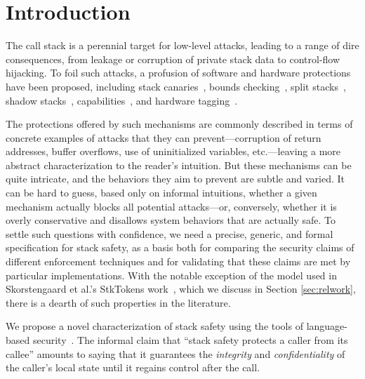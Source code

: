 \documentclass[10pt,conference]{ieeetran}%
\theoremstyle{definition}
\begin{document}
\newcommand{\paragraphx}[1]{\emph{#1.}}

\section{Introduction}

The call stack is a perennial target for low-level attacks, leading to a
range of dire consequences, from leakage or corruption of private stack data
to control-flow hijacking. To foil such attacks, a profusion of
software and hardware protections have been proposed,
%
including stack canaries~\cite{Cowan+98},
bounds checking~\cite{NagarakatteZMZ09,NagarakatteZMZ10,DeviettiBMZ08},
split stacks~\cite{Kuznetsov+14},
shadow stacks~\cite{Dang+15,Shanbhogue+19},
capabilities~\cite{Woodruff+14,Chisnall+15,SkorstengaardLocal,SkorstengaardSTKJFP,Georges+21},
and hardware tagging~\cite{DBLP:conf/sp/RoesslerD18}.
  \ifaftersubmission{}
\fi

The protections offered by such mechanisms are commonly described in terms
of concrete examples of attacks that they can prevent---corruption of return
addresses, buffer overflows, use of uninitialized variables, etc.---leaving
a more abstract characterization to the reader's intuition.  But these
mechanisms can be quite intricate, and the behaviors they aim to prevent are
subtle and varied. It can be hard to guess, based only on informal
intuitions, whether a given mechanism actually blocks all potential
attacks---or, conversely, whether it is overly conservative and disallows
system behaviors that are actually safe.
To settle such questions with confidence,
we need a precise, generic, and formal specification for stack
safety, as a basis both for comparing the security claims of different
enforcement techniques and for validating that these claims
are met by particular implementations. With the notable exception of the model used
in Skorstengaard et al.'s StkTokens work~\cite{SkorstengaardSTKJFP}, which we
discuss in Section \ref{sec:relwork}, there is a dearth of such properties in
the literature.

We propose a novel characterization of stack safety using the tools of language-based
security~\cite{sabelfeld2003language}. The informal claim that
``stack safety protects a caller
from its callee'' amounts to saying that it guarantees the {\em integrity} and
{\em confidentiality} of the caller’s local state until it regains control after the call.
\end{document}
